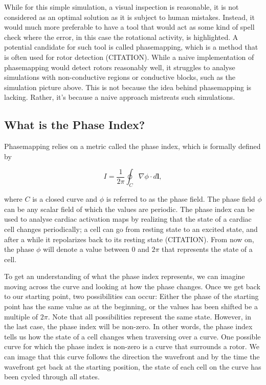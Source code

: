 \documentclass[twocolumn]{article}
\begin{document}
While for this simple simulation, a visual inspection is reasonable,
it is not considered as an optimal solution as it is subject to human mistakes.
Instead, it would much more preferable to have a tool
that would act as some kind of spell check where the error,
in this case the rotational activity, is highlighted.
A potential candidate for such tool is called phasemapping,
which is a method that is often used for rotor detection (CITATION).
While a naive implementation of phasemapping would detect rotors
reasonably well,
it struggles to analyse simulations with non-conductive regions or
conductive blocks,
such as the simulation picture above.
This is not because the idea behind phasemapping is lacking.
Rather, it's because a naive approach mistreats such simulations.

\subsection{What is the Phase Index?}\label{what-is-the-phase-index}

Phasemapping relies on a metric called the phase index,
which is formally defined by

\begin{equation}
  I = \frac{1}{2\pi}\oint_C \nabla \phi \cdot d\bm{l} ,
  \label{eq:phase-index}
\end{equation}

\noindent where $C$ is a closed curve
and $\phi$ is referred to as the phase field.
The phase field $\phi$ can be any scalar field of which the values are periodic.
The phase index can be used to analyse cardiac activation maps
by realizing that the state of a cardiac cell changes periodically;
a cell can go from resting state to an excited state,
and after a while it repolarizes back to its resting state (CITATION).
From now on, the phase $\phi$ will denote a value between $0$ and $2\pi$
that represents the state of a cell.

To get an understanding of what the phase index represents,
we can imagine moving across the curve
and looking at how the phase changes.
Once we get back to our starting point,
two possibilities can occur:
Either the phase of the starting point has the same value as at the beginning,
or the values has been shifted be a multiple of $2\pi$.
Note that all possibilities represent the same state.
However, in the last case, the phase index will be non-zero.
In other words, the phase index tells us how the state of a cell changes when traversing over a curve.
One possible curve for which the phase index is non-zero is a curve that surrounds a rotor.
We can image that this curve follows the direction the wavefront
and by the time the wavefront get back at the starting position,
the state of each cell on the curve has been cycled through all states.
\end{document}
